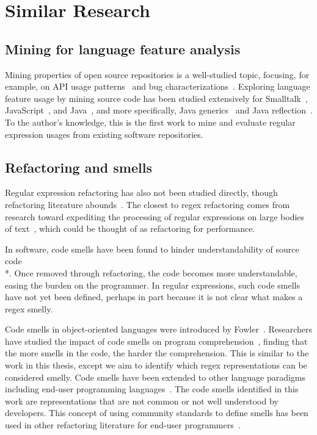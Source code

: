 \section{Similar Research}

\subsection{Mining for language feature analysis}
Mining properties of open source repositories is a well-studied topic, focusing, for example, on API usage patterns~ and bug characterizations~.
Exploring language feature usage by mining source code has been studied extensively for
Smalltalk~,
JavaScript~,
and Java~,
and more specifically,
Java generics~ and
Java reflection~.
To the author's knowledge, this is the first work to mine and evaluate regular expression usages from existing software repositories.

\subsection{Refactoring and smells}
Regular expression refactoring has also not been studied directly, though refactoring literature abounds~.
The closest to regex refactoring comes from research toward  expediting the processing of regular expressions on large bodies of text~, which could be thought of as refactoring for performance.

In software, code smells have been found to hinder understandability of source code \\*.
Once removed through refactoring, the code becomes more understandable, easing the burden on the programmer.
In regular expressions, such code smells have not yet been defined, perhaps in part because it is not clear what makes a regex smelly.

Code smells in object-oriented languages were introduced by Fowler~. Researchers have studied the impact of code smells on program comprehension~, finding that the more smells in the code, the harder the comprehension. This is similar to the work in this thesis, except we aim to identify which  regex representations can be considered smelly.
Code smells have been extended to other language paradigms including end-user programming languages~. The code smells identified in this work are representations that are not common or not well understood by developers. This concept of using community standards to define smells has been used in other refactoring literature  for end-user programmers~.
